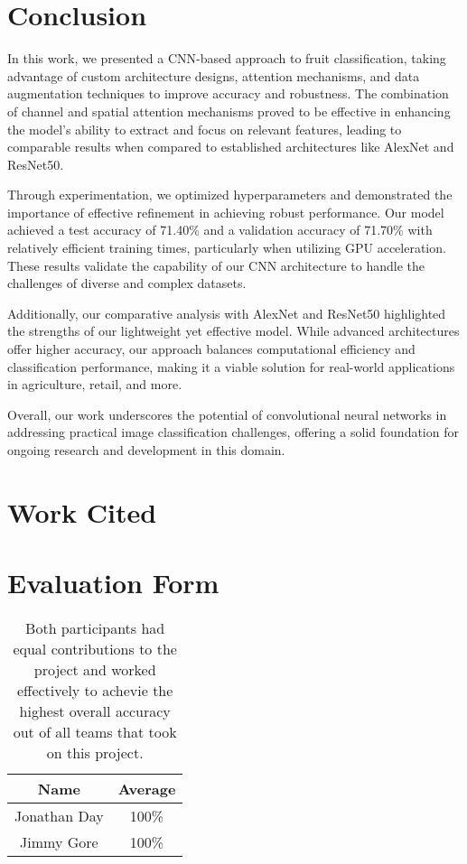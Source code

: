 \documentclass{article}
\begin{document}
\section{Conclusion}

In this work, we presented a CNN-based approach to fruit classification, taking advantage of custom architecture designs, attention mechanisms, and data augmentation techniques to improve accuracy and robustness. The combination of channel and spatial attention mechanisms proved to be effective in enhancing the model's ability to extract and focus on relevant features, leading to comparable results when compared to established architectures like AlexNet and ResNet50.

Through experimentation, we optimized hyperparameters and demonstrated the importance of effective refinement in achieving robust performance. Our model achieved a test accuracy of 71.40\% and a validation accuracy of 71.70\% with relatively efficient training times, particularly when utilizing GPU acceleration. These results validate the capability of our CNN architecture to handle the challenges of diverse and complex datasets.

Additionally, our comparative analysis with AlexNet and ResNet50 \cite{he2016deep} highlighted the strengths of our lightweight yet effective model. While advanced architectures offer higher accuracy, our approach balances computational efficiency and classification performance, making it a viable solution for real-world applications in agriculture, retail, and more.

Overall, our work underscores the potential of convolutional neural networks in addressing practical image classification challenges, offering a solid foundation for ongoing research and development in this domain.

\section{Work Cited}




\newpage
\section{Evaluation Form}


\begin{table}[h!]
\centering
\begin{tabular}{|c|c|}
\hline
\textbf{Name} & \textbf{Average} \\ \hline
Jonathan Day & 100\% \\ \hline
Jimmy Gore & 100\% \\ \hline
\end{tabular}
\caption{Both participants had equal contributions to the project and worked effectively to achevie the highest overall accuracy out of all teams that took on this project.}
\end{table}
\end{document}
